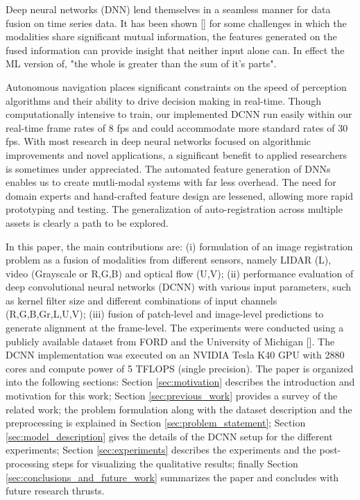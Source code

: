 \documentclass{article}
\begin{document}
Deep neural networks (DNN) lend themselves in a seamless manner for data fusion on time series data. It has been shown [\cite{Ngiam2011Multimodal}] for some challenges in which the modalities share significant mutual information, the features generated on the fused information can provide insight that neither input alone can. In effect the ML version of, "the whole is greater than the sum of it's parts". 

Autonomous navigation places significant constraints on the speed of perception algorithms and their ability to drive decision making in real-time. Though computationally intensive to train, our implemented DCNN run easily within our real-time frame rates of 8 fps and could accommodate more standard rates of 30 fps. 
With most research in deep neural networks focused on algorithmic improvements and novel applications, a significant benefit to applied researchers is sometimes under appreciated. The automated feature generation of DNNs enables us to create mutli-modal systems with far less overhead. The need for domain experts and hand-crafted feature design are lessened, allowing more rapid prototyping and testing. The generalization of auto-registration across multiple assets is clearly a path to be explored. 

In this paper, the main contributions are: (i) formulation of an image registration problem as a fusion of modalities from different sensors, namely LIDAR (L), video (Grayscale or R,G,B) and optical flow (U,V); (ii) performance evaluation of deep convolutional neural networks (DCNN) with various input parameters, such as kernel filter size and different combinations of input channels (R,G,B,Gr,L,U,V); (iii) fusion of patch-level and image-level predictions to generate alignment at the frame-level. The experiments were conducted using a publicly available dataset from FORD and the University of Michigan [\cite{Pandey2011Ford-Campu}]. The DCNN implementation was executed on an NVIDIA Tesla K40 GPU with 2880 cores and compute power of 5 TFLOPS (single precision). The paper is organized into the following sections: Section \ref{sec:motivation} describes the introduction and motivation for this work; Section \ref{sec:previous_work} provides a survey of the related work; the problem formulation along with the dataset description and the preprocessing is explained in Section \ref{sec:problem_statement}; Section \ref{sec:model_description} gives the details of the DCNN setup for the different experiments; Section \ref{sec:experiments} describes the experiments and the post-processing steps for visualizing the qualitative results; finally Section \ref{sec:conclusions_and_future_work} summarizes the paper and concludes with future research thrusts.
\end{document}
